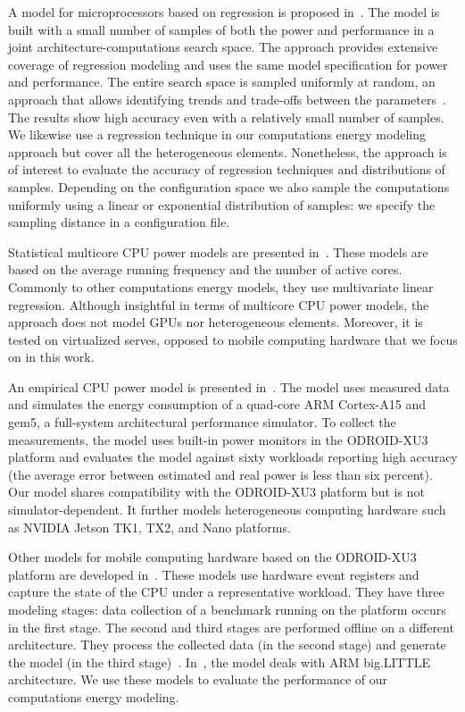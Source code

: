 A model for microprocessors based on regression is proposed in~\citep{lee2006statistically,lee2006accurate}. The model is built with a small number of samples of both the power and performance in a joint architecture-computations search space. The approach provides extensive coverage of regression modeling and uses the same model specification for power and performance. The entire search space is sampled uniformly at random, an approach that allows identifying trends and trade-offs between the parameters~\citep{lee2006accurate}. The results show high accuracy even with a relatively small number of samples. We likewise use a regression technique in our computations energy modeling approach but cover all the heterogeneous elements. Nonetheless, the approach is of interest to evaluate the accuracy of regression techniques and distributions of samples. Depending on the configuration space we also sample the computations uniformly using a linear or exponential distribution of samples: we specify the sampling distance in a configuration file. 

Statistical multicore CPU power models are presented in~\citep{takouna2011accurate}. These models are based on the average running frequency and the number of active cores. Commonly to other computations energy models, they use multivariate linear regression. Although insightful in terms of multicore CPU power models, the approach does not model GPUs nor heterogeneous elements. Moreover, it is tested on virtualized serves, opposed to mobile computing hardware that we focus on in this work. 

An empirical CPU power model is presented in~\citep{reddy2017empirical}. The model uses measured data and simulates the energy consumption of a quad-core ARM Cortex-A15 and gem5, a full-system architectural performance simulator. To collect the measurements, the model uses built-in power monitors in the ODROID-XU3 platform and evaluates the model against sixty workloads reporting high accuracy (the average error between estimated and real power is less than six percent). Our model shares compatibility with the ODROID-XU3 platform but is not simulator-dependent. It further models heterogeneous computing hardware such as NVIDIA Jetson TK1, TX2, and Nano platforms. 
 
Other models for mobile computing hardware based on the ODROID-XU3 platform are developed in~\citep{nunez2013enabling, nikov2015evaluation}. These models use hardware event registers and capture the state of the CPU under a representative workload. They have three modeling stages: data collection of a benchmark running on the platform occurs in the first stage. The second and third stages are performed offline on a different architecture. They process the collected data (in the second stage) and generate the model (in the third stage)~\citep{seewald2019coarse}. In~\citep{nikov2015evaluation}, the model deals with ARM big.LITTLE architecture. We use these models to evaluate the performance of our computations energy modeling.

